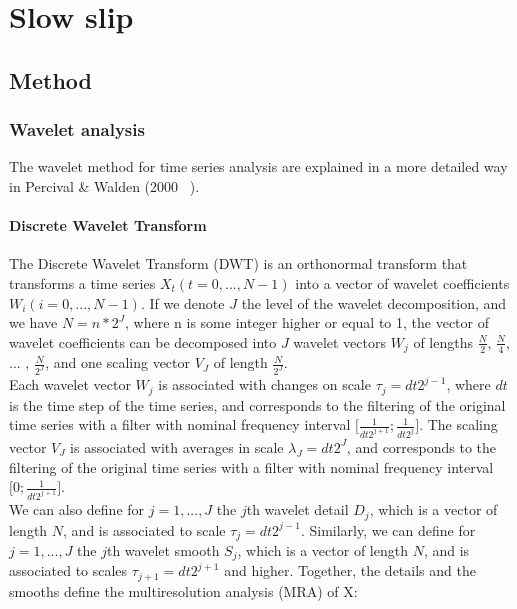 \documentclass[main.tex]{subfiles}
\begin{document}
\part{Slow slip}

\chapter{Method}

\section{Wavelet analysis}

The wavelet method for time series analysis are explained in a more detailed way in Percival \& Walden (2000 ~\cite{PER_2000}). \\

\subsection{Discrete Wavelet Transform}

The Discrete Wavelet Transform (DWT) is an orthonormal transform that transforms a time series $X_t \left( t = 0, ... , N - 1 \right)$ into a vector of wavelet coefficients $W_i \left( i = 0 , ... , N - 1 \right)$. If we denote $J$ the level of the wavelet decomposition, and we have $N = n* 2^J$, where n is some integer higher or equal to 1, the vector of wavelet coefficients can be decomposed into $J$ wavelet vectors $W_j$ of lengths $\frac{N}{2}$, $\frac{N}{4}$, ... , $\frac{N}{2^J}$, and one scaling vector $V_J$ of length $\frac{N}{2^J}$. \\

Each wavelet vector $W_j$ is associated with changes on scale $\tau_j = dt 2^{j - 1}$, where $dt$ is the time step of the time series, and corresponds to the filtering of the original time series with a filter with nominal frequency interval $\lbrack \frac{1}{dt 2^{j + 1}} ; \frac{1}{dt 2^j} \rbrack$. The scaling vector $V_J$ is associated with averages in scale $\lambda_J = dt 2^J$, and corresponds to the filtering of the original time series with a filter with nominal frequency interval $\lbrack 0 ; \frac{1}{dt 2^{j + 1}} \rbrack$. \\

We can also define for $j = 1 , ... , J$ the $j$th wavelet detail $D_j$, which is a vector of length $N$, and is associated to scale $\tau_j = dt 2^{j - 1}$. Similarly, we can define for $j = 1 , ... , J$ the $j$th wavelet smooth $S_j$, which is a vector of length $N$, and is associated to scales $\tau_{j + 1} = dt 2^{j + 1}$ and higher. Together, the details and the smooths define the multiresolution analysis (MRA) of X:
\end{document}

